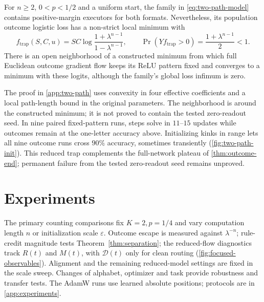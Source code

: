 \begin{proposition}
\label{prop:two-path-trap}
For $n\ge2$, $0<p<1/2$ and a uniform start, the family in
\cref{eq:two-path-model} contains positive-margin executors for both formats.
Nevertheless, its population outcome logistic loss has a non-strict local minimum
with
\[
 f_{\mathrm{trap}}(S,C,u)=S C\log\frac{1+\lambda^{n-1}}{1-\lambda^{n-1}},
 \qquad \Pr(Yf_{\mathrm{trap}}>0)=\frac{1+\lambda^{n-1}}2<1.
\]
There is an open neighborhood of a constructed minimum from which full
Euclidean outcome gradient flow keeps its ReLU pattern fixed and converges
to a minimum with these logits, although the family's global loss infimum is zero.
\end{proposition}
The proof in \cref{app:two-path} uses convexity in four effective coefficients
and a local path-length bound in the original parameters. The neighborhood is
around the constructed minimum; it is not proved to contain the tested zero-readout
seed. In nine paired fixed-pattern runs, steps solve in $11$--$15$ updates while
outcomes remain at the one-letter accuracy above. Initializing kinks in range
lets all nine outcome runs cross $90\%$ accuracy, sometimes transiently
(\cref{fig:two-path-init}). This reduced trap complements the full-network plateau
of \cref{thm:outcome-end}; permanent failure from the tested zero-readout seed remains unproved.

\suppressfloats[t]
\section{Experiments}
\label{sec:experiments}
\label{sec:validation}

The primary counting comparisons fix $K=2,p=1/4$ and vary computation length
$n$ or initialization scale $\varepsilon$. Outcome escape is measured against
$\lambda^{-n}$; rule-credit magnitude tests Theorem~\ref{thm:separation};
the reduced-flow diagnostics track $R(t)$ and $M(t)$, with $\mathcal D(t)$
only for clean routing (\cref{fig:focused-observables}). Alignment and the remaining
reduced-model settings are fixed in the scale sweep. Changes of alphabet,
optimizer and task provide robustness and transfer tests. The AdamW runs use
learned absolute positions; protocols are in \cref{app:experiments}.

